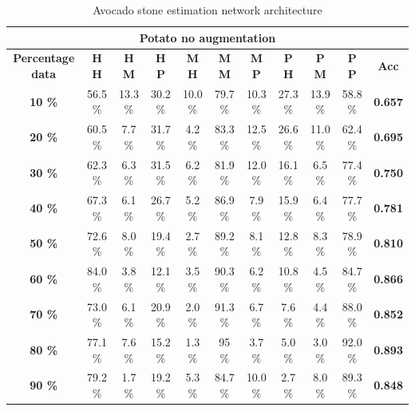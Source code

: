 \documentclass[11pt]{article}
\begin{document}
  \begin{table}[h!]
  \centering
  \begin{adjustbox}{max width=\textwidth}
  \begin{tabular}{*{11}{c}}%
  \hline
  \multicolumn{11}{c}{\textbf{Potato no augmentation}}
  \\
 \hline
 \textbf{Percentage data} & \textbf{H H} & \textbf{H M} & \textbf{H P} & \textbf{M H} & \textbf{M M} & \textbf{M P} & \textbf{P H} & \textbf{P M} & \textbf{P P} & \textbf{Acc}\\
 \hline
 \hline
 \textbf{10 \%}  & 56.5 \% & 13.3 \% & 30.2 \% & 10.0 \% & 79.7 \% & 10.3 \% & 27.3 \% & 13.9 \% & 58.8 \% & \textbf{0.657} \\
 \hline
 \textbf{20 \%} & 60.5 \% & 7.7 \% & 31.7 \% & 4.2 \% & 83.3 \% & 12.5 \% & 26.6 \% & 11.0 \% & 62.4 \% & \textbf{0.695} \\
 \hline
 \textbf{30 \%} & 62.3 \% & 6.3 \% & 31.5 \% & 6.2 \% & 81.9 \% & 12.0 \% & 16.1 \% & 6.5 \% & 77.4 \% & \textbf{0.750} \\
 \hline
 \textbf{40 \%} & 67.3 \% & 6.1 \% & 26.7 \% & 5.2 \% & 86.9 \% & 7.9 \% & 15.9 \% & 6.4 \%  & 77.7 \% & \textbf{0.781} \\
 \hline
 \textbf{50 \%} & 72.6 \% & 8.0 \% & 19.4 \% & 2.7 \% & 89.2 \% & 8.1 \% & 12.8 \% & 8.3 \% & 78.9 \% & \textbf{0.810} \\
 \hline
 \textbf{60 \%} & 84.0 \% & 3.8 \% & 12.1 \% & 3.5 \% & 90.3 \% & 6.2 \% & 10.8 \% & 4.5 \% & 84.7 \% & \textbf{0.866} \\
 \hline
 \textbf{70 \%} & 73.0 \% & 6.1 \% & 20.9 \% & 2.0 \% & 91.3 \% & 6.7 \% & 7.6 \% & 4.4 \% & 88.0 \% & \textbf{0.852} \\
 \hline
\textbf{80 \%} & 77.1 \% & 7.6 \% & 15.2 \%  & 1.3 \% & 95 \% & 3.7 \% & 5.0 \% & 3.0 \% & 92.0 \% & \textbf{0.893} \\
 \hline
 \textbf{90 \%} & 79.2 \% & 1.7 \% & 19.2 \% & 5.3 \% & 84.7 \% & 10.0 \% & 2.7 \% & 8.0 \% & 89.3 \% & \textbf{0.848} \\
 \hline
\end{tabular}
\end{adjustbox}
  \caption{Avocado stone estimation network architecture}
  \label{tab:experiments_avo_cnn}
\end{table}
\end{document}
